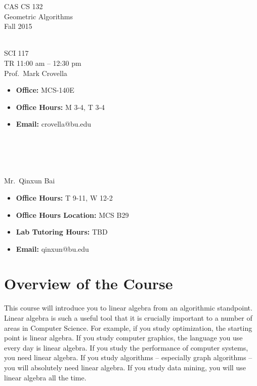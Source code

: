 \documentclass[11pt]{article}
\begin{document}
\sloppy 
\begin{center}
\LARGE CAS CS 132\\
\Large Geometric Algorithms\\
\Large\rm Fall 2015\\~\\
\end{center}

 SCI 117\\[\baselineskip]
 TR 11:00 am -- 12:30 pm 
\\[\baselineskip] 

 Prof.\ Mark Crovella\\[0.75\baselineskip]
\begin{minipage}[t]{0.60\textwidth}
\begin{itemize}
\item {\bf Office:} MCS-140E
\item {\bf Office Hours:} {\small M 3-4,  T 3-4}
\item {\bf Email:} crovella@bu.edu
\end{itemize}
\end{minipage}
~\\~\\~\\~\\
  Mr.\ Qinxun Bai\\[0.75\baselineskip]
 \begin{minipage}[t]{0.60\textwidth}
 \begin{itemize}
 \item {\bf Office Hours:} {\small T 9-11, W 12-2}
 \item {\bf Office Hours Location:} MCS B29 
 \item {\bf Lab Tutoring Hours:} {\small TBD}
 \item {\bf Email:} qinxun@bu.edu
 \end{itemize}
 \end{minipage}

\section*{Overview of the Course}

This course will introduce you to linear algebra from an algorithmic
standpoint.  Linear algebra is such a useful tool that it is crucially
important to a number of areas in Computer Science. For example, if you study
optimization, the starting point is linear algebra. If you study
computer graphics, the language you use every day is linear algebra. If
you study the performance of computer systems, you need linear
algebra. If you study algorithms -- especially graph algorithms -- you
will absolutely need linear algebra. If you study data mining, you will
use linear algebra all the time. 
\end{document}
